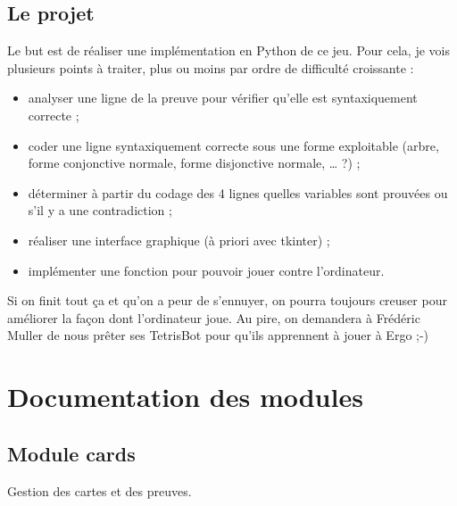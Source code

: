 \documentclass[letterpaper,10pt,french]{sphinxmanual}
\begin{document}
\section{Le projet}
\label{\detokenize{regles:le-projet}}
Le but est de réaliser une implémentation en Python de ce jeu. Pour cela, je vois plusieurs points à traiter, plus ou moins par ordre de difficulté croissante :
\begin{itemize}
\item {} 
analyser une ligne de la preuve pour vérifier qu’elle est syntaxiquement correcte ;

\item {} 
coder une ligne syntaxiquement correcte sous une forme exploitable (arbre, forme conjonctive normale, forme disjonctive normale, … ?) ;

\item {} 
déterminer à partir du codage des 4 lignes quelles variables sont prouvées ou s’il y a une contradiction ;

\item {} 
réaliser une interface graphique (à priori avec tkinter) ;

\item {} 
implémenter une fonction pour pouvoir jouer contre l’ordinateur.

\end{itemize}

Si on finit tout ça et qu’on a peur de s’ennuyer, on pourra toujours creuser pour améliorer la façon dont l’ordinateur joue. Au pire, on demandera à Frédéric Muller de nous prêter ses TetrisBot pour qu’ils apprennent à jouer à Ergo ;-)


\chapter{Documentation des modules}
\label{\detokenize{doc_classe::doc}}\label{\detokenize{doc_classe:documentation-des-modules}}

\section{Module cards}
\label{\detokenize{doc_classe:module-cards}}
Gestion des cartes et des preuves.
\end{document}
